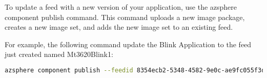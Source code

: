 To update a feed with a new version of your application, use the azsphere component publish command. This command uploads a new image package, creates a new image set, and adds the new image set to an existing feed.

For example, the following command update the Blink Application to the feed just created named Mt3620Blink1:
\begin{lstlisting}[language=bash]
azsphere component publish --feedid 8354ecb2-5348-4582-9e0c-ae9fc055f3db --imagepath "C:\Users\A548068\Documents\AZure\Blink\Mt3620Blink1\Mt3620Blink1\bin\ARM\Debug\Mt3620Blink1.imagepackage" 
\end{lstlisting}
